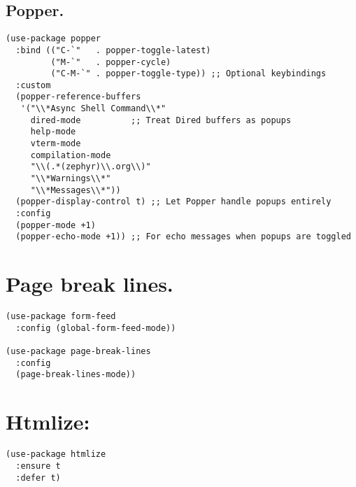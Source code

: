 \documentclass[11pt]{article}
\begin{document}
\subsection{Popper.}
\label{sec:orge555172}
\begin{verbatim}
(use-package popper
  :bind (("C-`"   . popper-toggle-latest)
         ("M-`"   . popper-cycle)
         ("C-M-`" . popper-toggle-type)) ;; Optional keybindings
  :custom
  (popper-reference-buffers
   '("\\*Async Shell Command\\*"
     dired-mode          ;; Treat Dired buffers as popups
     help-mode
     vterm-mode
     compilation-mode
     "\\(.*(zephyr)\\.org\\)"
     "\\*Warnings\\*"
     "\\*Messages\\*"))
  (popper-display-control t) ;; Let Popper handle popups entirely
  :config
  (popper-mode +1)
  (popper-echo-mode +1)) ;; For echo messages when popups are toggled
\end{verbatim}
\section{Page break lines.}
\label{sec:orgf605c24}
\begin{verbatim}
(use-package form-feed
  :config (global-form-feed-mode))

(use-package page-break-lines
  :config
  (page-break-lines-mode))
\end{verbatim}
\section{Htmlize:}
\label{sec:org7213c1d}
\begin{verbatim}
(use-package htmlize
  :ensure t
  :defer t)
\end{verbatim}
\end{document}
